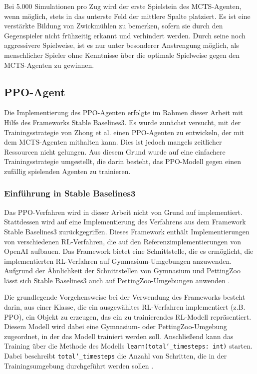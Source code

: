 Bei 5.000 Simulationen pro Zug wird der erste Spielstein des MCTS-Agenten, wenn möglich, stets in das unterste Feld der mittlere Spalte platziert. Es ist eine verstärkte Bildung von Zwickmühlen zu bemerken, sofern sie durch den Gegenspieler nicht frühzeitig erkannt und verhindert werden. Durch seine noch aggressivere Spielweise, ist es nur unter besonderer Anstrengung möglich, als menschlicher Spieler ohne Kenntnisse über die optimale Spielweise gegen den MCTS-Agenten zu gewinnen.

\subsection{PPO-Agent}

Die Implementierung des PPO-Agenten erfolgte im Rahmen dieser Arbeit mit Hilfe des Frameworks Stable Baselines3. Es wurde zunächst versucht, mit der Trainingsstrategie von Zhong et al. einen PPO-Agenten zu entwickeln, der mit dem MCTS-Agenten mithalten kann. Dies ist jedoch mangels zeitlicher Ressourcen nicht gelungen. Aus diesem Grund wurde auf eine einfachere Trainingsstrategie umgestellt, die darin besteht, das PPO-Modell gegen einen zufällig spielenden Agenten zu trainieren.

\subsubsection{Einführung in Stable Baselines3}

Das PPO-Verfahren wird in dieser Arbeit nicht von Grund auf implementiert. Stattdessen wird auf eine Implementierung des Verfahrens aus dem Framework Stable Baselines3 zurückgegriffen. Dieses Framework enthält Implementierungen von verschiedenen RL-Verfahren, die auf den Referenzimplementierungen von OpenAI aufbauen. Das Framework bietet eine Schnittstelle, die es ermöglicht, die implementierten RL-Verfahren auf Gymnasium-Umgebungen anzuwenden. Aufgrund der Ähnlichkeit der Schnittstellen von Gymnasium und PettingZoo lässt sich Stable Baselines3 auch auf PettingZoo-Umgebungen anwenden \cite{Raffin.2021} \cite{Farama.2025}.

Die grundlegende Vorgehensweise bei der Verwendung des Frameworks besteht darin, aus einer Klasse, die ein ausgewähltes RL-Verfahren implementiert (z.B. PPO), ein Objekt zu erzeugen, das ein zu trainierendes RL-Modell repräsentiert. Diesem Modell wird dabei eine Gymnasium- oder PettingZoo-Umgebung zugeordnet, in der das Modell trainiert werden soll. Anschließend kann das Training über die Methode des Modells \texttt{learn(total\char`_timesteps: int)} starten. Dabei beschreibt \texttt{total\char`_timesteps} die Anzahl von Schritten, die in der Trainingsumgebung durchgeführt werden sollen \cite{Raffin.2021}.

